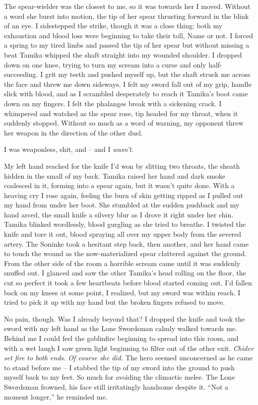 \documentclass[12pt, openany]{book}
\begin{document}
The spear-wielder was the closest to me, so it was towards her I moved. Without a word she burst into motion, the tip of her spear thrusting forward in the blink of an eye. I sidestepped the strike, though it was a close thing: both my exhaustion and blood loss were beginning to take their toll, Name or not. I forced a spring to my tired limbs and passed the tip of her spear but without missing a beat Tamika whipped the shaft straight into my wounded shoulder. I dropped down on one knee, trying to turn my scream into a curse and only half-succeeding. I grit my teeth and pushed myself up, but the shaft struck me across the face and threw me down sideways. I felt my sword fall out of my grip, handle slick with blood, and as I scrambled desperately to reach it Tamika’s boot came down on my fingers. I felt the phalanges break with a sickening crack. I whimpered and watched as the spear rose, tip headed for my throat, when it suddenly stopped. Without so much as a word of warning, my opponent threw her weapon in the direction of the other duel.

I was weaponless, shit, and – and I \textit{wasn’t.}

My left hand reached for the knife I’d won by slitting two throats, the sheath hidden in the small of my back. Tamika raised her hand and dark smoke coalesced in it, forming into a spear again, but it wasn’t quite done. With a heaving cry I rose again, feeling the burn of skin getting ripped as I pulled out my hand from under her boot. She stumbled at the sudden pushback and my hand arced, the small knife a silvery blur as I drove it right under her chin. Tamika blinked wordlessly, blood gurgling as she tried to breathe. I twisted the knife and tore it out, blood spraying all over my upper body from the severed artery. The Soninke took a hesitant step back, then another, and her hand came to touch the wound as the now-materialized spear clattered against the ground. From the other side of the room a horrible scream came until it was suddenly snuffed out. I glanced and saw the other Tamika’s head rolling on the floor, the cut so perfect it took a few heartbeats before blood started coming out. I’d fallen back on my knees at some point, I realized, but my sword was within reach. I tried to pick it up with my hand but the broken fingers refused to move. 

No pain, though. Was I already beyond that? I dropped the knife and took the sword with my left hand as the Lone Swordsman calmly walked towards me. Behind me I could feel the goblinfire beginning to spread into this room, and with a wet laugh I saw green light beginning to filter out of the other exit. \textit{Chider set fire to both ends. Of course she did. }The hero seemed unconcerned as he came to stand before me – I stabbed the tip of my sword into the ground to push myself back to my feet. So much for avoiding the climactic melee. The Lone Swordsman frowned, his face still irritatingly handsome despite it. “Not a moment longer,” he reminded me.
\end{document}
